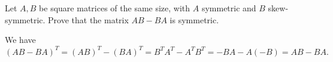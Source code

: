 \begin{exer}
Let $A, B$ be square matrices of the same size, with $A$ symmetric
and $B$ skew-symmetric. Prove that the matrix $AB - BA$ is
symmetric. 
\vspace*{1in}
\begin{answer} We have
$(AB - BA)^T = (AB)^T - (BA)^T = B^TA^T - A^TB^T = -BA - A(-B) = AB - BA.$
\end{answer}
\end{exer}


